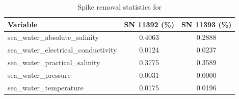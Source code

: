 \begin{table}[h]
\centering
\caption{Spike removal statistics for \projectname{} \casenumber{}}
\label{tab:ntas20_spike_stats}
\begin{tabular}{|l|c|c|}
\hline
Variable & SN 11392 (\%) & SN 11393 (\%) \\
\hline
sea\_water\_absolute\_salinity & 0.4063 & 0.2888 \\
sea\_water\_electrical\_conductivity & 0.0124 & 0.0237 \\
sea\_water\_practical\_salinity & 0.3775 & 0.3589 \\
sea\_water\_pressure & 0.0031 & 0.0000 \\
sea\_water\_temperature & 0.0175 & 0.0196 \\
\hline
\end{tabular}
\end{table}
